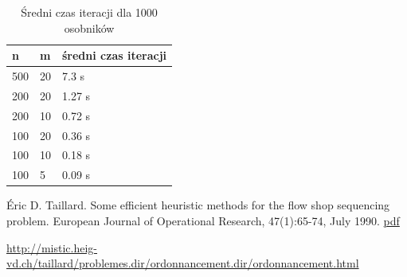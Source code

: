 \documentclass[11pt, a4wide]{article}
\begin{document}
\begin{table}[H]
\caption{Średni czas iteracji dla 1000 osobników}
\label{sredniaiteracja}
\begin{center}
\begin{tabular}{|l|l|l|}
  \hline
  n & m & średni czas iteracji \\
  \hline
  500 & 20 & 7.3 s \\
  200 & 20 & 1.27 s \\
  200 & 10 & 0.72 s \\
  100 & 20 & 0.36 s \\
  100 & 10 & 0.18 s \\
  100 & 5 & 0.09 s \\
  \hline
\end{tabular}
\end{center}
\end{table}







\begin{thebibliography}{}
Éric D. Taillard. 
Some efficient heuristic methods for the flow shop sequencing problem. 
European Journal of Operational Research, 47(1):65-74, July 1990.
\href{http://mistic.heig-vd.ch/taillard/articles.dir/Taillard1990.pdf}{pdf}

\url{http://mistic.heig-vd.ch/taillard/problemes.dir/ordonnancement.dir/ordonnancement.html}

\end{thebibliography}
\end{document}
